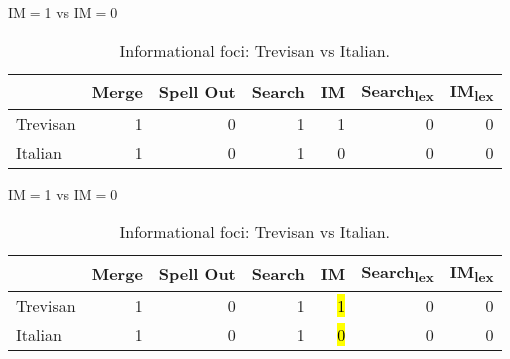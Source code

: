 \documentclass[lesson_slides]{subfiles}
\begin{document}
\begin{frame}[c]{IM$=$1 vs IM$=$0}

\begin{table}[ht]
    \centering
    \begin{tabular}{|l|r|r|r|r|r|r|}
    \hline
     & Merge & Spell Out & Search & IM & Search\textsubscript{lex} & IM\textsubscript{lex} \\
    \hline
    Trevisan & 1 & 0 & 1 & 1 & 0 & 0\\
    \hline
    Italian & 1 & 0 & 1 & 0 & 0 & 0 \\
    \hline
    \end{tabular}
    \caption{\label{tab:samp2}Informational foci: Trevisan vs Italian.}
    \end{table}

\end{frame}
\begin{frame}[c]{IM$=$1 vs IM$=$0}

\begin{table}[ht]
    \centering
    \begin{tabular}{|l|r|r|r|r|r|r|}
    \hline
     & Merge & Spell Out & Search & IM & Search\textsubscript{lex} & IM\textsubscript{lex} \\
    \hline
    Trevisan & 1 & 0 & 1 & \hl{1} & 0 & 0\\
    \hline
    Italian & 1 & 0 & 1 & \hl{0} & 0 & 0 \\
    \hline
    \end{tabular}
    \caption{\label{tab:samp2}Informational foci: Trevisan vs Italian.}
    \end{table}

\end{frame}
\end{document}
